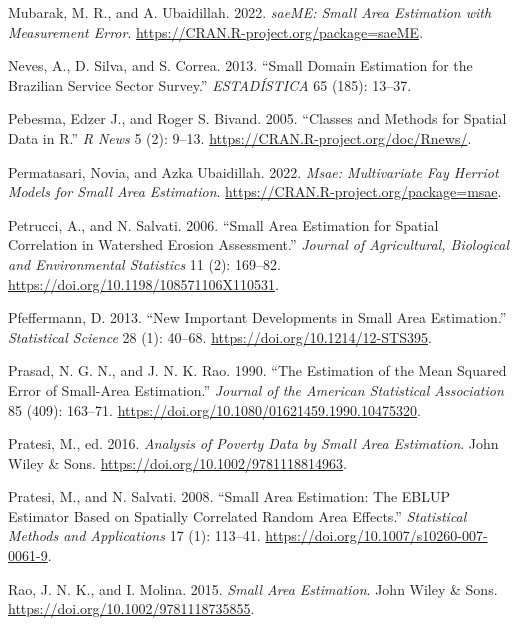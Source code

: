 \begin{CSLReferences}{1}{0}
\leavevmode{}%
Mubarak, M. R., and A. Ubaidillah. 2022. \emph{saeME: Small Area Estimation with Measurement Error}. \url{https://CRAN.R-project.org/package=saeME}.

\leavevmode{}%
Neves, A., D. Silva, and S. Correa. 2013. {``Small Domain Estimation for the {B}razilian Service Sector Survey.''} \emph{ESTADÍSTICA} 65 (185): 13--37.

\leavevmode{}%
Pebesma, Edzer J., and Roger S. Bivand. 2005. {``Classes and Methods for Spatial Data in {R}.''} \emph{R News} 5 (2): 9--13. \url{https://CRAN.R-project.org/doc/Rnews/}.

\leavevmode{}%
Permatasari, Novia, and Azka Ubaidillah. 2022. \emph{Msae: Multivariate Fay Herriot Models for Small Area Estimation}. \url{https://CRAN.R-project.org/package=msae}.

\leavevmode{}%
Petrucci, A., and N. Salvati. 2006. {``Small Area Estimation for Spatial Correlation in Watershed Erosion Assessment.''} \emph{Journal of Agricultural, Biological and Environmental Statistics} 11 (2): 169--82. \url{https://doi.org/10.1198/108571106X110531}.

\leavevmode{}%
Pfeffermann, D. 2013. {``New Important Developments in Small Area Estimation.''} \emph{Statistical Science} 28 (1): 40--68. \url{https://doi.org/10.1214/12-STS395}.

\leavevmode{}%
Prasad, N. G. N., and J. N. K. Rao. 1990. {``The Estimation of the Mean Squared Error of Small-Area Estimation.''} \emph{Journal of the American Statistical Association} 85 (409): 163--71. \url{https://doi.org/10.1080/01621459.1990.10475320}.

\leavevmode{}%
Pratesi, M., ed. 2016. \emph{Analysis of Poverty Data by Small Area Estimation}. John Wiley \& Sons. \url{https://doi.org/10.1002/9781118814963}.

\leavevmode{}%
Pratesi, M., and N. Salvati. 2008. {``Small Area Estimation: The EBLUP Estimator Based on Spatially Correlated Random Area Effects.''} \emph{Statistical Methods and Applications} 17 (1): 113--41. \url{https://doi.org/10.1007/s10260-007-0061-9}.

\leavevmode{}%
Rao, J. N. K., and I. Molina. 2015. \emph{Small Area Estimation}. John Wiley \& Sons. \url{https://doi.org/10.1002/9781118735855}.


\end{CSLReferences}
